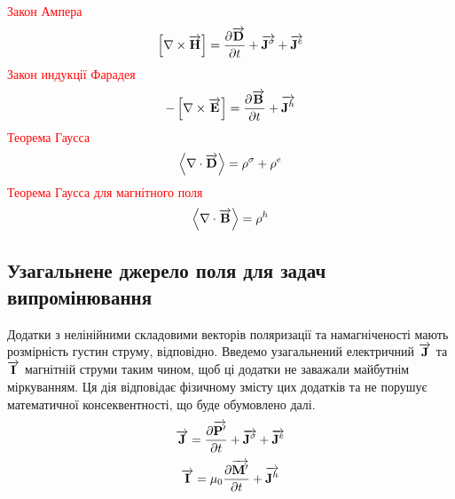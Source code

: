 \textcolor{red}{Закон Ампера}
\begin{equation} \label{eq:AmpereLow}
\left[ \nabla \times \overrightarrow{\mathbf H} \right] = 
\frac{\partial \overrightarrow{\mathbf D}}{\partial t} + \overrightarrow{\mathbf J^\sigma} + \overrightarrow{\mathbf J^e}
\end{equation}
%
\textcolor{red}{Закон индукції Фарадея}
\begin{equation} \label{eq:FaradayInduction}
-\left[ \nabla \times \overrightarrow{\mathbf E} \right] =
\frac{\partial \overrightarrow{\mathbf B}}{\partial t} + \overrightarrow{\mathbf J^{h}}
\end{equation}
%
\textcolor{red}{Теорема Гаусса}
\begin{equation} \label{eq:GaussTheorem}
\left< \nabla \cdot \overrightarrow{\mathbf D} \right> = \rho^\sigma + \rho^e
\end{equation}
%
\textcolor{red}{Теорема Гаусса для магнітного поля}
\begin{equation} \label{eq:GaussMagnetic}
\left< \nabla \cdot \overrightarrow{\mathbf B} \right> = \rho^h
\end{equation}

\subsection{Узагальнене джерело поля для задач випромінювання}

Додатки з нелінійними складовими векторів поляризації та намагніченості мають
розмірність густин струму, відповідно. Введемо узагальнений електричний 
$ \overrightarrow{\mathbf J} $ та $ \overrightarrow{\mathbf I} $ магнітній струми таким чином, щоб ці додатки 
не заважали майбутнім міркуванням. Ця дія відповідає фізичному змісту цих 
додатків та не порушує математичної консеквентності, що буде обумовлено далі.
%
\begin{equation*}
\overrightarrow{\mathbf J} = \frac{\partial \overrightarrow{\mathbf P^\prime}}{\partial t} + 
\overrightarrow{\mathbf J^\sigma} + \overrightarrow{\mathbf J^e}
\end{equation*}
%
\begin{equation*}
\overrightarrow{\mathbf I} = \mu_0 \frac{\partial \overrightarrow{\mathbf M^\prime}}{\partial t} + \overrightarrow{\mathbf J^h}
\end{equation*}

